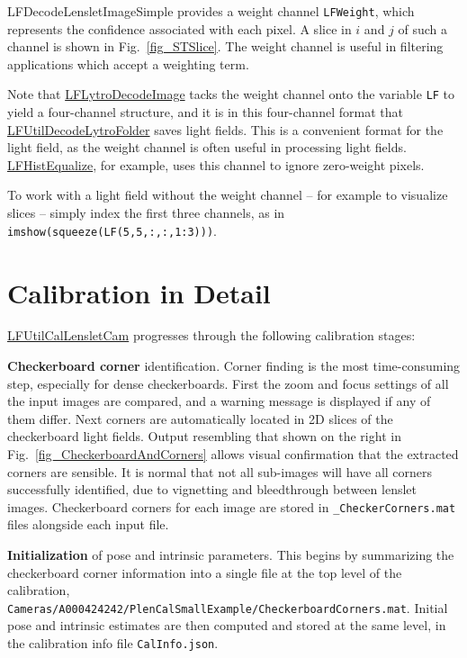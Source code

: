 \documentclass[onecolumn]{article}
\newcommand{\CiteFunc}[1]{\hyperlink{#1}{\small #1}}
\newcommand{\SupFunction}[1]{{\small #1}}
\newcommand{\SymbolText}[1]{\texttt{\small #1}}
\begin{document}
\SupFunction{LFDecodeLensletImageSimple} provides a weight channel \SymbolText{LFWeight}, which represents the confidence associated with each pixel. A slice in $i$ and $j$ of such a channel is shown in Fig.~\ref{fig_STSlice}. The weight channel is useful in filtering applications which accept a weighting term.

Note that \CiteFunc{LFLytroDecodeImage} tacks the weight channel onto the variable \SymbolText{LF} to yield a four-channel structure, and it is in this four-channel format that \CiteFunc{LFUtilDecodeLytroFolder} saves light fields. This is a convenient format for the light field, as the weight channel is often useful in processing light fields.  \CiteFunc{LFHistEqualize}, for example, uses this channel to ignore zero-weight pixels. 

To work with a light field without the weight channel -- for example to visualize slices -- simply index the first three channels, as in\\ \SymbolText{imshow(squeeze(LF(5,5,:,:,1:3)))}.

\section{Calibration in Detail}
\label{sect_Calibration}
\CiteFunc{LFUtilCalLensletCam} progresses through the following calibration stages:

\textbf{Checkerboard corner} identification.  Corner finding is the most time-consuming step, especially for dense checkerboards.  First the zoom and focus settings of all the input images are compared, and a warning message is displayed if any of them differ.  Next corners are automatically located in 2D slices of the checkerboard light fields.  Output resembling that shown on the right in Fig.~\ref{fig_CheckerboardAndCorners} allows visual confirmation that the extracted corners are sensible. It is normal that not all sub-images will have all corners successfully identified, due to vignetting and bleedthrough between lenslet images.  Checkerboard corners for each image are stored in \SymbolText{*\_CheckerCorners.mat} files alongside each input file.

\textbf{Initialization} of pose and intrinsic parameters. This begins by summarizing the checkerboard corner information into a single file at the top level of the calibration, \SymbolText{Cameras/A000424242/PlenCalSmallExample/CheckerboardCorners.mat}. Initial pose and intrinsic estimates are then computed and stored at the same level, in the calibration info file \SymbolText{CalInfo.json}.
\end{document}
